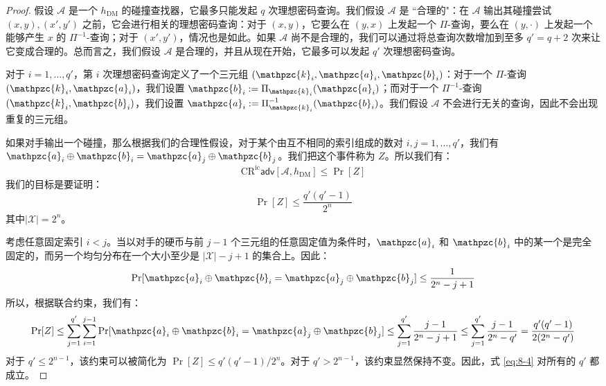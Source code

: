 \begin{proof}
假设 $\mathcal{A}$ 是一个 $h_\mathrm{DM}$ 的碰撞查找器，它最多只能发起 $q$ 次理想密码查询。我们假设 $\mathcal{A}$ 是 ``合理的"：在 $\mathcal{A}$ 输出其碰撞尝试 $(x,y),(x',y')$ 之前，它会进行相关的理想密码查询：对于 $(x,y)$，它要么在 $(y,x)$ 上发起一个 $\Pi$-查询，要么在 $(y,\cdot)$ 上发起一个能够产生 $x$ 的 $\Pi^{-1}$-查询；对于 $(x',y')$，情况也是如此。如果 $\mathcal{A}$ 尚不是合理的，我们可以通过将总查询次数增加到至多 $q'=q+2$ 次来让它变成合理的。总而言之，我们假设 $\mathcal{A}$ 是合理的，并且从现在开始，它最多可以发起 $q'$ 次理想密码查询。

对于 $i=1,\dots,q'$，第 $i$ 次理想密码查询定义了一个三元组 $(\mathpzc{k}_i,\mathpzc{a}_i,\mathpzc{b}_i)$：对于一个 $\Pi$-查询 $(\mathpzc{k}_i,\mathpzc{a}_i)$，我们设置 $\mathpzc{b}_i:=\Pi_{\mathpzc{k}_i}(\mathpzc{a}_i)$；而对于一个 $\Pi^{-1}$-查询 $(\mathpzc{k}_i,\mathpzc{b}_i)$，我们设置 $\mathpzc{a}_i:=\Pi_{\mathpzc{k}_i}^{-1}(\mathpzc{b}_i)$。我们假设 $\mathcal{A}$ 不会进行无关的查询，因此不会出现重复的三元组。

如果对手输出一个碰撞，那么根据我们的合理性假设，对于某个由互不相同的索引组成的数对 $i,j=1,\dots,q'$，我们有 $\mathpzc{a}_i\oplus\mathpzc{b}_i=\mathpzc{a}_j\oplus\mathpzc{b}_j$。我们把这个事件称为 $Z$。所以我们有：
\[
\mathrm{CR}^\mathrm{ic}\mathsf{adv}[\mathcal{A},h_\mathrm{DM}]\leq\Pr[Z]
\]
我们的目标是要证明：
\begin{equation}\label{eq:8-4}
\Pr[Z]\leq
\frac{q'(q'-1)}{2^n}
\end{equation}
其中$|\mathcal{X}|=2^n$。
 
考虑任意固定索引 $i < j$。当以对手的硬币与前 $j-1$ 个三元组的任意固定值为条件时，$\mathpzc{a}_i$ 和 $\mathpzc{b}_i$ 中的某一个是完全固定的，而另一个均匀分布在一个大小至少是 $|\mathcal{X}|-j+1$ 的集合上。因此：
\[
\Pr[\mathpzc{a}_i\oplus\mathpzc{b}_i=\mathpzc{a}_j\oplus\mathpzc{b}_j]
\leq
\frac{1}{2^n-j+1}
\]
所以，根据联合约束，我们有：
\begin{equation}\label{eq:8-5}
\Pr[Z]
\leq
\sum_{j=1}^{q'}\sum_{i=1}^{j-1}\Pr[\mathpzc{a}_i\oplus\mathpzc{b}_i=\mathpzc{a}_j\oplus\mathpzc{b}_j]
\leq
\sum_{j=1}^{q'}\frac{j-1}{2^n-j+1}
\leq
\sum_{j=1}^{q'}\frac{j-1}{2^n-q'}
=\frac{q'(q'-1)}{2(2^n-q')}
\end{equation}
对于 $q'\leq2^{n-1}$，该约束可以被简化为 $\Pr[Z]\leq q'(q'-1)/2^n$。对于 $q'>2^{n-1}$，该约束显然保持不变。因此，式 \ref{eq:8-4} 对所有的 $q'$ 都成立。
\end{proof}